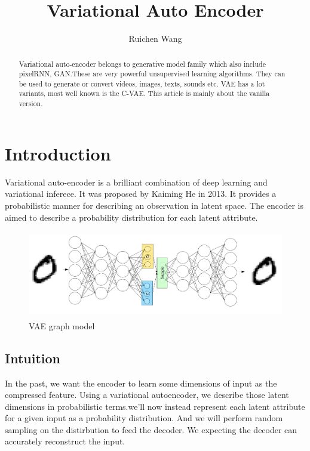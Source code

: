 \documentclass{article}
\author{Ruichen Wang}
\title{Variational Auto Encoder}
\begin{document}
\maketitle
\begin{abstract}
Variational auto-encoder \cite{DBLP:journals/corr/KingmaW13} belongs to generative model family which also include pixelRNN, GAN.These are very powerful unsupervised learning algorithms. They can be used to generate or convert videos, images, texts, sounds etc. VAE has a lot variants, most well known is the C-VAE. This article is mainly about the vanilla version.
\end{abstract}

\tableofcontents
\section{Introduction} 
Variational auto-encoder is a brilliant combination of deep learning and variational inferece. It was proposed by Kaiming He in 2013. It provides a probabilistic manner for describing an observation in latent space. The encoder is aimed to describe a probability distribution for each latent attribute.
\begin{figure}[h]
\centering
\includegraphics[width=5in,height=1.5in]{graph1}
\caption{VAE graph model}
\end{figure}
\subsection{Intuition}
In the past, we want the encoder to learn some  dimensions of input as the compressed feature. Using a variational autoencoder, we describe those latent dimensions in probabilistic terms.we'll now instead represent each latent attribute for a given input as a probability distribution. And we will perform random sampling on the distirbution to feed the decoder. We expecting the decoder can accurately reconstruct the input.
\end{document}
